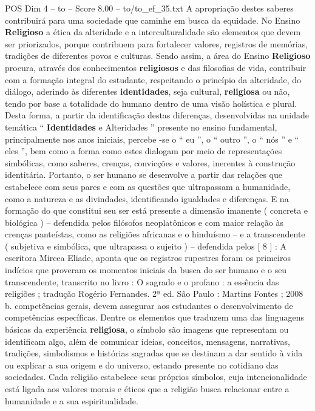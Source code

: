 \begin{textsample}{POS Dim 4 – to – Score 8.00 – to/to\_ef\_35.txt}
A apropriação destes saberes contribuirá para uma sociedade que caminhe em busca da equidade.
No Ensino \textbf{Religioso} a ética da alteridade e a interculturalidade são elementos que devem ser priorizados, porque contribuem para fortalecer valores, registros de memórias, tradições de diferentes povos e culturas.
Sendo assim, a área do Ensino \textbf{Religioso} procura, através dos conhecimentos \textbf{religiosos} e das filosofias de vida, contribuir com a formação integral do estudante, respeitando o princípio da alteridade, do diálogo, aderindo às diferentes \textbf{identidades}, seja cultural, \textbf{religiosa} ou não, tendo por base a totalidade do humano dentro de uma visão holística e plural.
Desta forma, a partir da identificação destas diferenças, desenvolvidas na unidade temática “ \textbf{Identidades} e Alteridades ” presente no ensino fundamental, principalmente nos anos iniciais, percebe -se o “ eu ”, o “ outro ”, o “ nós ” e “ eles ”, bem como a forma como estes dialogam por meio de representações simbólicas, como saberes, crenças, convicções e valores, inerentes à construção identitária.
Portanto, o ser humano se desenvolve a partir das relações que estabelece com seus pares e com as questões que ultrapassam a humanidade, como a natureza e as divindades, identificando igualdades e diferenças.
E na formação do que constitui seu ser está presente a dimensão imanente ( concreta e biológica ) – defendida pelos filósofos neoplatônicos e com maior relação às crenças panteístas, como as religiões africanas e o hinduísmo – e a transcendente ( subjetiva e simbólica, que ultrapassa o sujeito ) – defendida pelos [ 8 ] : A escritora Mircea Eliade, aponta que os registros rupestres foram os primeiros indícios que proveram os momentos iniciais da busca do ser humano e o seu transcendente, transcrito no livro : O sagrado e o profano : a essência das religiões ; tradução Rogério Fernandes. 2ª ed.
São Paulo : Martins Fontes ; 2008 b. competências gerais, devem assegurar aos estudantes o desenvolvimento de competências específicas.
Dentre os elementos que traduzem uma das linguagens básicas da experiência \textbf{religiosa}, o símbolo são imagens que representam ou identificam algo, além de comunicar ideias, conceitos, mensagens, narrativas, tradições, simbolismos e histórias sagradas que se destinam a dar sentido à vida ou explicar a sua origem e do universo, estando presente no cotidiano das sociedades.
Cada religião estabelece seus próprios símbolos, cuja intencionalidade está ligada aos valores morais e éticos que a religião busca relacionar entre a humanidade e a sua espiritualidade.

\end{textsample}
